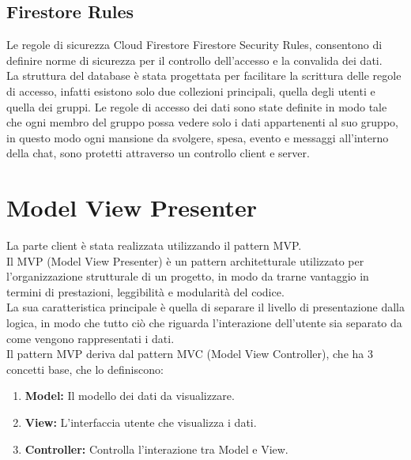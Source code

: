 \subsection{Firestore Rules}
Le regole di sicurezza Cloud Firestore Firestore Security Rules, consentono di definire norme di sicurezza per il controllo dell'accesso e la convalida dei dati.\\
La struttura del database è stata progettata per facilitare la scrittura delle regole di accesso, infatti esistono solo due collezioni principali, quella degli utenti e quella dei gruppi. Le regole di accesso dei dati sono state definite in modo tale che ogni membro del gruppo possa vedere solo i dati appartenenti al suo gruppo, in questo modo ogni mansione da svolgere, spesa, evento e messaggi all'interno della chat, sono protetti attraverso un controllo client e server.

\section{Model View Presenter}                 %
La parte client è stata realizzata utilizzando il pattern MVP.\\
Il MVP (Model View Presenter) è un pattern architetturale utilizzato per l'organizzazione strutturale di un progetto, in modo da trarne vantaggio in termini di prestazioni, leggibilità e modularità del codice.\\
La sua caratteristica principale è quella di separare il livello di presentazione dalla logica, in modo che tutto ciò che riguarda l'interazione dell'utente sia separato da come vengono rappresentati i dati.\\
Il pattern MVP deriva dal pattern MVC (Model View Controller), che ha 3 concetti base, che lo definiscono:

\begin{enumerate}
   \item \textbf{Model:} Il modello dei dati da visualizzare.
   \item \textbf{View:} L'interfaccia utente che visualizza i dati.
   \item \textbf{Controller:} Controlla l'interazione tra Model e View.
\end{enumerate}

